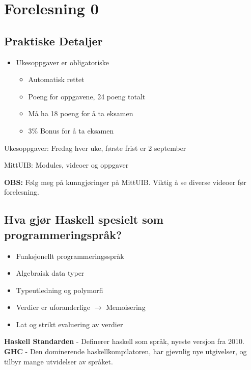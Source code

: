 \documentclass{article}
\begin{document}
\section{Forelesning 0}

\subsection{Praktiske Detaljer}
\begin{itemize}
    \item Ukesoppgaver er obligatoriske
        \begin{itemize}
            \item Automatisk rettet
            \item Poeng for oppgavene, 24 poeng totalt
            \item Må ha 18 poeng for å ta eksamen
            \item 3\% Bonus for å ta eksamen
        \end{itemize}
\end{itemize}

Ukesoppgaver: Fredag hver uke, første frist er 2 september
\medskip

MittUIB: Modules, videoer og oppgaver
\bigskip

\textbf{OBS:} Følg meg på kunngjøringer på MittUIB. Viktig å se diverse videoer før forelesning.


\subsection{Hva gjør Haskell spesielt som programmeringspråk?}

\begin{itemize}
    \item  Funksjonellt programmeringsspråk
    \item Algebraisk data typer 
    \item Typeutledning og polymorfi
    \item Verdier er uforanderlige \( \rightarrow \) Memoisering
    \item Lat og strikt evaluering av verdier
\end{itemize}
\bigskip


\textbf{Haskell Standarden} - Definerer haskell som språk, nyeste versjon fra 2010. \textbf{GHC} - Den dominerende haskellkompilatoren, har gjevnlig nye utgivelser, og tilbyr mange utvidelser av språket.
\end{document}

